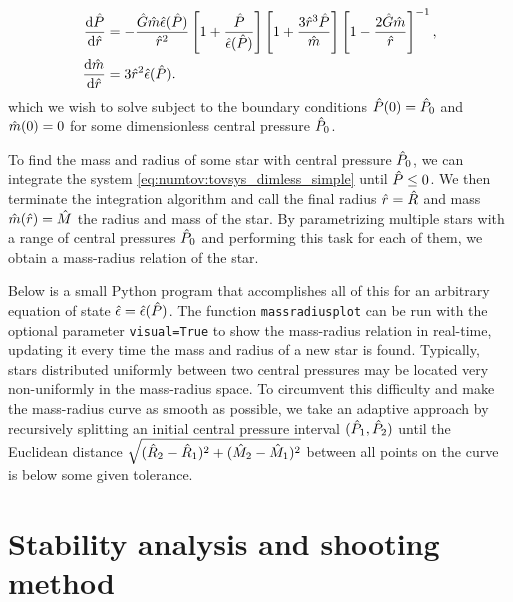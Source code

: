 \begin{subequations}
\label{eq:numtov:tovsys_dimless_simple}
\begin{align}
	\odv{\diml{P}}{\diml{r}} &= - \frac{\diml{G} \diml{m} \diml{\epsilon}(\diml{P})}{\diml{r}^2} \left[ 1 + \frac{\diml{P}}{\diml{\epsilon}(\diml{P})} \right] \left[ 1 + \frac{3 \diml{r}^3 \diml{P}}{\diml{m}} \right] \left[ 1 - \frac{2 \diml{G} \diml{m}}{\diml{r}} \right]^{-1} , \\
	\odv{\diml{m}}{\diml{r}} &= 3 \diml{r}^2 \diml{\epsilon}(\diml{P}) .
\end{align}
\end{subequations}
which we wish to solve subject to the boundary conditions $\hat{P}(0) = \hat{P}_0$ and $\hat{m}(0) = 0$ for some dimensionless central pressure $\hat{P}_0$.

To find the mass and radius of some star with central pressure $\hat{P}_0$, we can integrate the system \eqref{eq:numtov:tovsys_dimless_simple} until $\hat{P} \le 0$.
We then terminate the integration algorithm and call the final radius $\hat{r} = \hat{R}$ and mass $\hat{m}(\hat{r}) = \hat{M}$ the radius and mass of the star.
By parametrizing multiple stars with a range of central pressures $\hat{P}_0$ and performing this task for each of them, we obtain a mass-radius relation of the star.

Below is a small Python program that accomplishes all of this for an arbitrary equation of state $\hat{\epsilon} = \hat{\epsilon}(\hat{P})$.
The function \verb|massradiusplot| can be run with the optional parameter \verb|visual=True| to show the mass-radius relation in real-time, updating it every time the mass and radius of a new star is found.
Typically, stars distributed uniformly between two central pressures may be located very non-uniformly in the mass-radius space.
To circumvent this difficulty and make the mass-radius curve as smooth as possible, we take an adaptive approach by recursively splitting an initial central pressure interval $(\hat{P}_1, \hat{P}_2)$ until the Euclidean distance $\sqrt{(\hat{R}_2-\hat{R}_1)^2 + (\hat{M}_2-\hat{M}_1)^2}$ between all points on the curve is below some given tolerance.


\section{Stability analysis and shooting method}
\label{sec:numerics:shooting_method}

